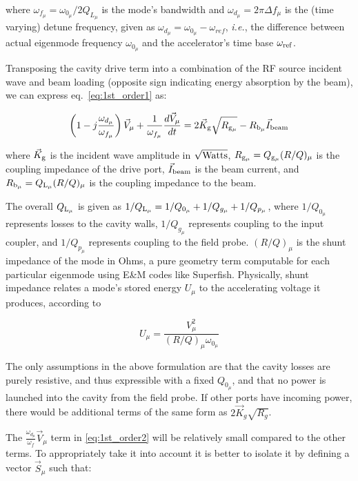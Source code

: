 \documentclass[a4paper,12pt]{article}
\begin{document}
\noindent where $\omega_{f_{\mu}}=\omega_{0_{\mu}}/2Q_{L_{\mu}}$ is the mode's bandwidth and $\omega_{d_{\mu}}=2\pi\Delta f_{\mu}$ is the (time varying) detune frequency, given as $\omega_{d_{\mu}}=\omega_{0_{\mu}}-\omega_{ref}$, {\it i.e.}, the difference between actual eigenmode frequency $\omega_{0_{\mu}}$ and the accelerator's time base $\omega_{\rm ref}$.

Transposing the cavity drive term into a combination of the RF source incident wave and beam loading (opposite sign indicating energy absorption by the beam), we can express eq.~\ref{eq:1st_order1} as:

\begin{equation}
  \left(1-j\frac{\omega_{d_{\mu}}}{\omega_{f_{\mu}}}\right)\vec V_{\mu} + {\frac{1}{\omega_{f_{\mu}}}}\frac{d\vec V_{\mu}}{dt} =  2\vec K_{\rm g}\sqrt{R_{\rm g_{\mu}}} - R_{\rm b_{\mu}}\vec I_{\rm beam}
  \label{eq:1st_order2}
\end{equation}

\noindent where $\vec K_{\rm g}$ is the incident wave amplitude in $\sqrt{\rm Watts}$, $R_{\rm g_{\mu}}=Q_{\rm g_{\mu}}(R/Q)_{\mu}$ is the coupling impedance of the drive port, $\vec I_{\rm beam}$ is the beam current, and $R_{\rm b_{\mu}}=Q_{\rm L_{\mu}}(R/Q)_{\mu}$ is the coupling impedance to the beam.

The overall $Q_{\rm L_{\mu}}$ is given as $1/Q_{\rm L_{\mu}}=1/Q_{0_{\mu}}+1/Q_{g_{\mu}}+1/Q_{p_{\mu}}$, where $1/Q_{0_{\mu}}$ represents losses to the cavity walls, $1/Q_{g_{\mu}}$ represents coupling to the input coupler, and $1/Q_{p_{\mu}}$ represents coupling to the field probe. $(R/Q)_{\mu}$ is the shunt impedance of the mode in Ohms, a pure geometry term computable for each particular eigenmode using E\&M codes like Superfish. Physically, shunt impedance relates a mode's stored energy $U_{\mu}$ to the accelerating voltage it produces, according to 

\begin{equation}
  U_{\mu} = \frac{V_{\mu}^2}{(R/Q)_{\mu}\omega_{0_{\mu}}}
\end{equation}

The only assumptions in the above formulation are that the cavity losses are purely resistive, and thus expressible with a fixed $Q_{0_{\mu}}$, and that no power is launched into the cavity from the field probe.  If other ports have incoming power, there would be additional terms of the same form as $2\vec K_g\sqrt{R_g}$.

The $\frac{\omega_{d_\mu}}{\omega_{f}}\vec{V}_{\mu}$ term in \ref{eq:1st_order2} will be relatively small compared to the other terms. To appropriately take it into account it is better to isolate it by defining  a vector $\vec{S}_{\mu}$ such that:
\end{document}
